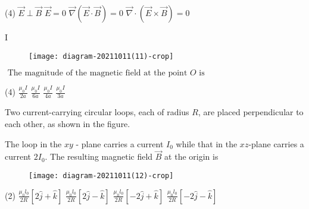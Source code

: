 \begin{enumerate}
\begin{minipage}{\textwidth}
\end{minipage}
\begin{tasks}(4)
	\task[\textbf{A.}] $\vec{E} \perp \vec{B}$
	\task[\textbf{B.}] $\vec{E}=0$
	\task[\textbf{C.}]$\vec{\nabla}(\vec{E} \cdot \vec{B})=0$
	\task[\textbf{D.}]$\vec{\nabla} \cdot(\vec{E} \times \vec{B})=0$
\end{tasks}
\begin{minipage}{\textwidth}
	\item {} I \\
	\begin{figure}[H]
		\centering
		\texttt{[image: diagram-20211011(11)-crop]}
	\end{figure}
	$\text { The magnitude of the magnetic field at the point } O \text { is }$
\end{minipage}
\begin{tasks}(4)
	\task[\textbf{A.}] $\frac{\mu_{0} I}{2 a}$
	\task[\textbf{B.}]$\frac{\mu_{0} I}{6 a}$
	\task[\textbf{C.}]$\frac{\mu_{0} I}{4 a}$
	\task[\textbf{D.}]$\frac{\mu_{0} I}{3 a}$
\end{tasks}
\begin{minipage}{\textwidth}
	\item Two current-carrying circular loops, each of radius $R$, are placed perpendicular to each other, as shown in the figure.
	
	The loop in the $x y$ - plane carries a current $I_{0}$ while that in the $x z$-plane carries a current $2 I_{0}$. The resulting magnetic field $\vec{B}$ at the origin is
	\begin{figure}[H]
		\centering
		\texttt{[image: diagram-20211011(12)-crop]}
	\end{figure}
\end{minipage}
\begin{tasks}(2)
	\task[\textbf{A.}] $\frac{\mu_{0} l_{0}}{2 R}[2 \hat{j}+\hat{k}]$ 
	\task[\textbf{B.}]$\frac{\mu_{0} l_{0}}{2 R}[2 \hat{j}-\hat{k}]$
	\task[\textbf{C.}]$\frac{\mu_{0} l_{0}}{2 R}[-2 \hat{j}+\hat{k}]$
	\task[\textbf{D.}]$\frac{\mu_{0} l_{0}}{2 R}[-2 \hat{j}-\hat{k}]$
\end{tasks}
\end{enumerate}
\setlength\arrayrulewidth{1pt}
